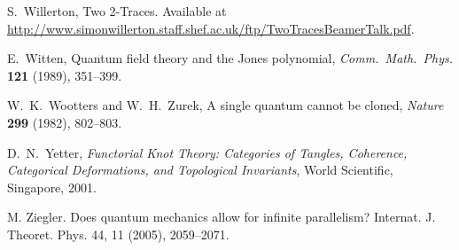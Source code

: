 \documentclass[12pt,twoside,openright]{report}
\begin{document}
\begin{thebibliography}{99}
 S.\ Willerton, Two 2-Traces.  Available at \\ \href{http://www.simonwillerton.staff.shef.ac.uk/ftp/TwoTracesBeamerTalk.pdf}{http://www.simonwillerton.staff.shef.ac.uk/ftp/TwoTracesBeamerTalk.pdf}.

 E.\ Witten, Quantum field theory and the Jones polynomial,
\textsl{Comm.\ Math.\ Phys.} \textbf{121} (1989), 351--399.

 W.\ K.\ Wootters and W.\ H.\ Zurek, A single quantum cannot be cloned, {\sl Nature} {\bf 299} 
(1982), 802--803. 

 D.\ N.\ Yetter, {\sl Functorial Knot Theory: Categories of Tangles, Coherence, Categorical Deformations, and Topological Invariants}, World Scientific, Singapore, 2001.

  M. Ziegler. Does quantum mechanics allow for infinite parallelism?  Internat. J. Theoret. Phys.  44, 11 (2005), 2059--2071.

\end{thebibliography}
\end{document}
